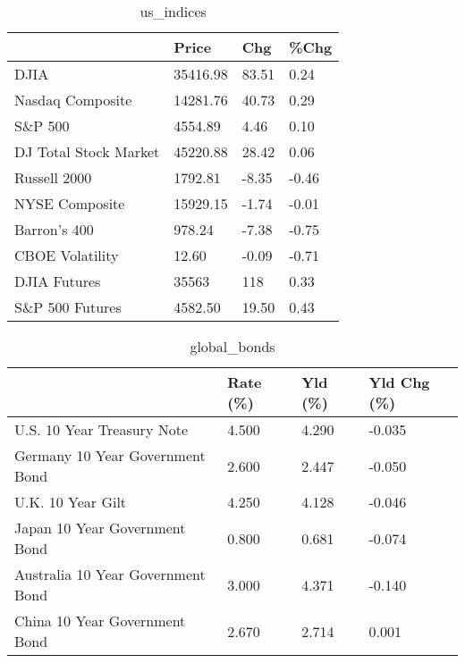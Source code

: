 \documentclass{article}%
\begin{document}
%


\begin{table}[htbp]%
\caption{us\_indices}%
\centering%
\begin{adjustbox}{width=1\textwidth}%
\begin{tabular}{llll}
\toprule
                      &    Price &   Chg &  \%Chg \\
\midrule
                 DJIA & 35416.98 & 83.51 &  0.24 \\
     Nasdaq Composite & 14281.76 & 40.73 &  0.29 \\
              S\&P 500 &  4554.89 &  4.46 &  0.10 \\
DJ Total Stock Market & 45220.88 & 28.42 &  0.06 \\
         Russell 2000 &  1792.81 & -8.35 & -0.46 \\
       NYSE Composite & 15929.15 & -1.74 & -0.01 \\
         Barron's 400 &   978.24 & -7.38 & -0.75 \\
      CBOE Volatility &    12.60 & -0.09 & -0.71 \\
         DJIA Futures &    35563 &   118 &  0.33 \\
      S\&P 500 Futures &  4582.50 & 19.50 &  0.43 \\
\bottomrule
\end{tabular}
%
\end{adjustbox}%
\end{table}

%


\begin{table}[htbp]%
\caption{global\_bonds}%
\centering%
\begin{adjustbox}{width=1\textwidth}%
\begin{tabular}{llll}
\toprule
                                  & Rate (\%) & Yld (\%) & Yld Chg (\%) \\
\midrule
       U.S. 10 Year Treasury Note &    4.500 &   4.290 &      -0.035 \\
  Germany 10 Year Government Bond &    2.600 &   2.447 &      -0.050 \\
                U.K. 10 Year Gilt &    4.250 &   4.128 &      -0.046 \\
    Japan 10 Year Government Bond &    0.800 &   0.681 &      -0.074 \\
Australia 10 Year Government Bond &    3.000 &   4.371 &      -0.140 \\
    China 10 Year Government Bond &    2.670 &   2.714 &       0.001 \\
\bottomrule
\end{tabular}
%
\end{adjustbox}%
\end{table}
\end{document}
